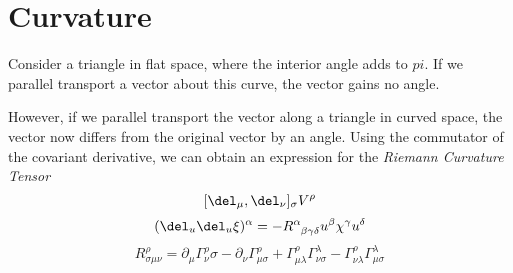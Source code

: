 \section{Curvature}
Consider a triangle in flat space, where the interior angle adds to \(pi\). If we parallel transport a vector about this curve, the vector gains no angle.

However, if we parallel transport the vector along a triangle in curved space, the vector now differs from the original vector by an angle. Using the commutator of the covariant derivative, we can obtain an expression for the \emph{Riemann Curvature Tensor}
\[[\del_\mu,\del_\nu]_\sigma V^\rho\]
\[(\del_u\del_u\xi)^\alpha = -R\indices{^\alpha_\beta_\gamma_\delta}u^\beta\chi^\gamma u^\delta\]
\[R^\rho_{\sigma\mu\nu} = \partial_\mu \Gamma^\rho_\nu\sigma - \partial_\nu \Gamma^\rho_{\mu\sigma} + \Gamma^\rho_{\mu\lambda}\Gamma^\lambda_{\nu\sigma}-\Gamma^\rho_{\nu\lambda}\Gamma^\lambda_{\mu\sigma}\]
